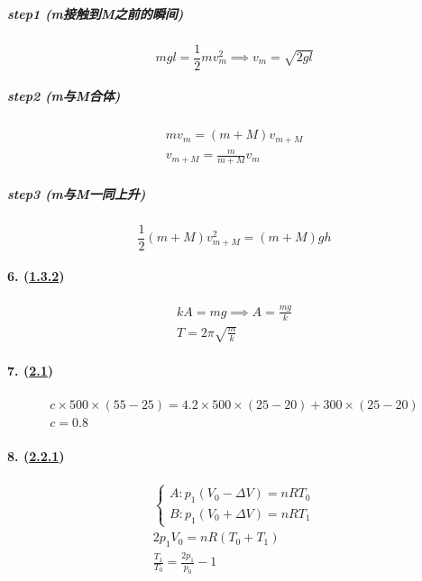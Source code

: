 \subparagraph{step1 (m接触到M之前的瞬间)}

\begin{equation*}
    mgl=\frac12mv_m^2\implies
    v_m=\sqrt{2gl}
\end{equation*}

\subparagraph{step2 (m与M合体)}

\begin{gather*}
    mv_m=(m+M)v_{m+M}\\
    v_{m+M}=\frac{m}{m+M}v_m
\end{gather*}

\subparagraph{step3 (m与M一同上升)}

\begin{equation*}
    \frac12(m+M)v_{m+M}^2=(m+M)gh
\end{equation*}

\paragraph{6. (\hyperref[subsec:1.3.2]{1.3.2})}

\begin{gather*}
    kA=mg\implies A=\frac{mg}{k}\\
    T=2\pi\sqrt{\frac{m}{k}}
\end{gather*}

\paragraph{7. (\hyperref[sec:2.1]{2.1})}

\begin{gather*}
    c\times500\times(55-25)=4.2\times500\times(25-20)+300\times(25-20)\\
    c=0.8
\end{gather*}

\paragraph{8. (\hyperref[subsec:2.2.1]{2.2.1})}

\begin{gather*}
    \begin{cases}
        A: p_1(V_0-\Delta V)=nRT_0\\
        B: p_1(V_0+\Delta V)=nRT_1
    \end{cases}\\
    2p_1V_0=nR(T_0+T_1)\\
    \frac{T_1}{T_0}=\frac{2p_1}{p_0}-1
\end{gather*}

